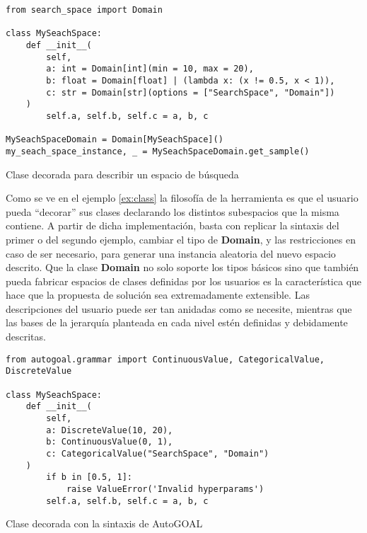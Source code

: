 \begin{listing}[!ht]
    \begin{verbatim}
from search_space import Domain

class MySeachSpace:
    def __init__(
        self, 
        a: int = Domain[int](min = 10, max = 20),
        b: float = Domain[float] | (lambda x: (x != 0.5, x < 1)),
        c: str = Domain[str](options = ["SearchSpace", "Domain"])
    )
        self.a, self.b, self.c = a, b, c

MySeachSpaceDomain = Domain[MySeachSpace]()
my_seach_space_instance, _ = MySeachSpaceDomain.get_sample()
    \end{verbatim}
    \caption{Clase decorada para describir un espacio de búsqueda}
    \label{ex:class}
\end{listing}


Como se ve en el ejemplo \ref{ex:class} la filosofía de la herramienta es que el usuario pueda “decorar” sus
clases declarando los distintos subespacios que la misma contiene. A partir de dicha implementación, basta
con replicar la sintaxis del primer o del segundo ejemplo, cambiar el tipo de {\bf Domain}, y las restricciones
en caso de ser necesario, para generar una instancia aleatoria del nuevo espacio descrito. Que la clase
    {\bf Domain} no solo soporte los tipos básicos sino que también pueda fabricar espacios de clases definidas por
los usuarios es la característica que hace que la propuesta de solución sea extremadamente extensible. Las
descripciones del usuario puede ser tan anidadas como se necesite, mientras que las bases de la jerarquía
planteada en cada nivel estén definidas y debidamente descritas.



\begin{listing}[!ht]
    \begin{verbatim}
from autogoal.grammar import ContinuousValue, CategoricalValue, DiscreteValue

class MySeachSpace:
    def __init__(
        self, 
        a: DiscreteValue(10, 20),
        b: ContinuousValue(0, 1),
        c: CategoricalValue("SearchSpace", "Domain")
    )
        if b in [0.5, 1]:
            raise ValueError('Invalid hyperparams')
        self.a, self.b, self.c = a, b, c
    \end{verbatim}
    \caption{Clase decorada con la sintaxis de AutoGOAL}
    \label{ex:autogoal}
\end{listing}


